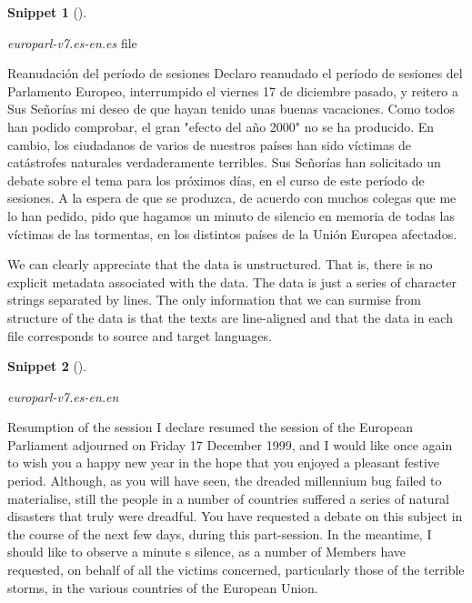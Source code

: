 \documentclass[
  letterpaper,
  krantz1]{latex/krantz-mod}
\newenvironment{Shaded}{\begin{snugshade}}{\end{snugshade}}
\newcommand{\NormalTok}[1]{\textcolor[rgb]{0.00,0.00,0.00}{#1}}
\theoremstyle{definition}
\theoremstyle{definition}
\newtheorem{definition}{Snippet}[chapter]
\theoremstyle{remark}
\begin{document}
\begin{definition}[]\protect\hypertarget{def-curate-europarl-es}{}\label{def-curate-europarl-es}

\emph{europarl-v7.es-en.es} file

\begin{Shaded}
\begin{Highlighting}[]
\NormalTok{Reanudación del período de sesiones}
\NormalTok{Declaro reanudado el período de sesiones del Parlamento Europeo, interrumpido el viernes 17 de diciembre pasado, y reitero a Sus Señorías mi deseo de que hayan tenido unas buenas vacaciones.}
\NormalTok{Como todos han podido comprobar, el gran "efecto del año 2000" no se ha producido. En cambio, los ciudadanos de varios de nuestros países han sido víctimas de catástrofes naturales verdaderamente terribles.}
\NormalTok{Sus Señorías han solicitado un debate sobre el tema para los próximos días, en el curso de este período de sesiones.}
\NormalTok{A la espera de que se produzca, de acuerdo con muchos colegas que me lo han pedido, pido que hagamos un minuto de silencio en memoria de todas las víctimas de las tormentas, en los distintos países de la Unión Europea afectados.}
\end{Highlighting}
\end{Shaded}

\end{definition}

We can clearly appreciate that the data is unstructured. That is, there
is no explicit metadata associated with the data. The data is just a
series of character strings separated by lines. The only information
that we can surmise from structure of the data is that the texts are
line-aligned and that the data in each file corresponds to source and
target languages.

\begin{definition}[]\protect\hypertarget{def-curate-europarl-en}{}\label{def-curate-europarl-en}

\emph{europarl-v7.es-en.en}

\begin{Shaded}
\begin{Highlighting}[]
\NormalTok{Resumption of the session}
\NormalTok{I declare resumed the session of the European Parliament adjourned on Friday 17 December 1999, and I would like once again to wish you a happy new year in the hope that you enjoyed a pleasant festive period.}
\NormalTok{Although, as you will have seen, the dreaded \textquotesingle{}millennium bug\textquotesingle{} failed to materialise, still the people in a number of countries suffered a series of natural disasters that truly were dreadful.}
\NormalTok{You have requested a debate on this subject in the course of the next few days, during this part{-}session.}
\NormalTok{In the meantime, I should like to observe a minute\textquotesingle{} s silence, as a number of Members have requested, on behalf of all the victims concerned, particularly those of the terrible storms, in the various countries of the European Union.}
\end{Highlighting}
\end{Shaded}

\end{definition}
\end{document}
